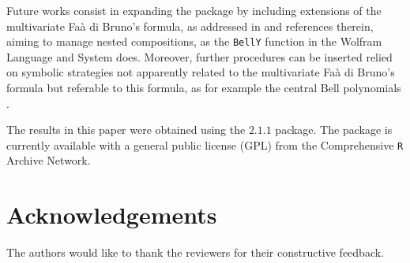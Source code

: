 Future works consist in expanding the  package by
including extensions of the multivariate Faà di Bruno's formula, as
addressed in \citet{MR2186441} and references therein, aiming to manage
nested compositions, as the \texttt{BellY} function in the Wolfram
Language and System does. Moreover, further procedures can be inserted
relied on symbolic strategies not apparently related to the multivariate
Faà di Bruno's formula but referable to this formula, as for example the
central Bell polynomials \citep{sym11020288}.

The results in this paper were obtained using the 
\(2.1.1\) package. The package is currently available with a general
public license (GPL) from the Comprehensive \texttt{R} Archive Network.

\hypertarget{acknowledgements}{%
\section{Acknowledgements}\label{acknowledgements}}

The authors would like to thank the reviewers for their constructive
feedback.



\address{%
Elvira Di Nardo\\
University of Turin\\%
Department of Mathematics ``G.Peano''\\ Via Carlo Alberto 10, 10123
Turin (Italy)\\
%
\url{https://www.elviradinardo.it}\\%
\textit{ORCiD: \href{https://orcid.org/0000-0003-3447-9155}{0000-0003-3447-9155}}\\%
\href{mailto:elvira.dinardo@unito.it}{\nolinkurl{elvira.dinardo@unito.it}}%
}

\address{%
Giuseppe Guarino\\
Università Cattolica del Sacro Cuore\\%
Largo Agostino Gemelli 8, 00168, Rome (Italy)\\
%
%
%
\href{mailto:giuseppe.guarino@rete.basilicata.it}{\nolinkurl{giuseppe.guarino@rete.basilicata.it}}%
}
